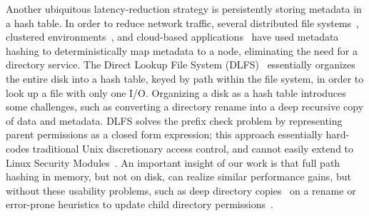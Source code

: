 Another ubiquitous latency-reduction strategy is persistently storing metadata in a hash table.
In order to reduce network traffic, several distributed file systems~\citep{zhu08hba,brandt03,icis12zhang},
clustered environments~\citep{sc09xing,sc12lafon},
and cloud-based applications~\citep{iccsn11wang} have used metadata hashing to deterministically
map metadata to a node, eliminating the need for a directory service.
The Direct Lookup File System (DLFS)~\citep{lensing13dlfs} essentially organizes the entire disk into a hash table,
keyed by path within the file system, in order to look up a file with only one I/O.
Organizing a disk as a hash table introduces some challenges, such as converting a directory rename
into a deep recursive copy of data and metadata.  
DLFS solves the prefix check problem by representing parent permissions as a closed form expression;
this approach essentially hard-codes traditional Unix discretionary access control, and cannot easily extend to Linux Security Modules~\citep{wright+lsm}.
An important insight of our work is that
full path hashing in memory, but not on disk,
can realize similar performance gains,
but without these usability problems, such as deep directory copies~\citep{lensing13dlfs} on a rename
or error-prone heuristics to update child directory permissions~\citep{swift01winnt}.




